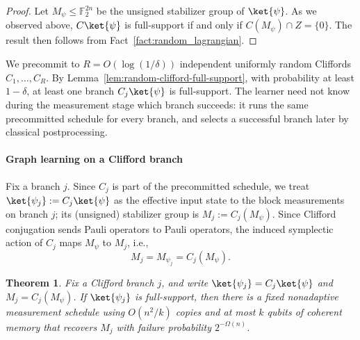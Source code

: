 \documentclass[11pt]{article}
\newtheorem{theorem}{Theorem}[section]
\newcommand{\F}{\mathbb{F}}
\begin{document}
\begin{proof}
Let $M_\psi\le \F_2^{2n}$ be the unsigned stabilizer group of $\ket{\psi}$. As we observed above, $C\ket{\psi}$ is full-support if and only if
$C(M_\psi)\cap Z=\{0\}$. The result then follows from Fact~\ref{fact:random_lagrangian}.
\end{proof}

We precommit to $R=O(\log(1/\delta))$ independent uniformly random Cliffords
$C_1,\ldots,C_R$.  By Lemma~\ref{lem:random-clifford-full-support}, with
probability at least $1-\delta$, at least one branch $C_j\ket{\psi}$ is
full-support.  The learner need not know during the measurement stage which
branch succeeds: it runs the same precommitted schedule for every branch, and
selects a successful branch later by classical postprocessing.

\paragraph{Graph learning on a Clifford branch}
Fix a branch $j$.  Since $C_j$ is part of the precommitted schedule, we
treat $\ket{\psi_j}:=C_j\ket{\psi}$ as the effective input state to the
block measurements on branch $j$; its (unsigned) stabilizer group is $M_j:=C_j(M_\psi)$.   Since Clifford conjugation sends Pauli
operators to Pauli operators, the induced symplectic action of $C_j$ maps
$M_\psi$ to $M_j$, i.e.,
$$
M_j=M_{\psi_j}=C_j(M_\psi).
$$

\begin{theorem}
\label{thm:nonadaptive-label-recovery}
Fix a Clifford branch $j$, and write $\ket{\psi_j}=C_j\ket{\psi}$ and
$M_j=C_j(M_\psi)$.  If $\ket{\psi_j}$ is full-support, then there is a fixed
nonadaptive measurement schedule using $O(n^2/k)$ copies and at most $k$ qubits
of coherent memory that recovers $M_j$ with failure probability
$2^{-\Omega(n)}$.
\end{theorem}
\end{document}
